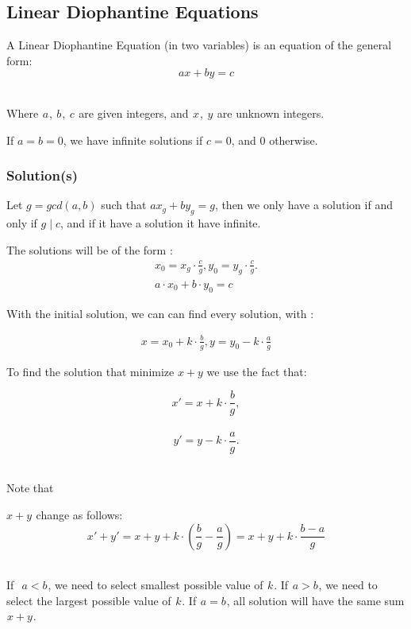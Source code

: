 \subsection{Linear Diophantine Equations}

A Linear Diophantine Equation (in two variables) is an equation of the general form:
 
$$ax + by = c$$ 

Where  $a$ ,  $b$ ,  $c$  are given integers, and  $x$ ,  $y$  are unknown integers.

If $ a = b = 0 $, we have infinite solutions if $ c = 0 $, and $0$ otherwise. 

\subsubsection{Solution(s)}

Let $g = gcd(a,b)$ such that $a x_g + b y_g = g$, then we only have a solution if and only if $g \mid c$, and if it have a solution it have infinite.

The solutions will be of the form :
 
\begin{equation}
  \begin{array}{c}
    x_0 = x_g \cdot \frac{c}{g},
 
    y_0 = y_g \cdot \frac{c}{g}. \\

    a \cdot x_0  + b \cdot y_0 = c 
  \end{array}
\end{equation}

With the initial solution, we can can find every solution, with : 

\begin{equation}
  \begin{array}{c}
    x = x_0 + k \cdot \frac{b}{g}, y = y_0 - k \cdot \frac{a}{g}
  \end{array}
\end{equation}

To find the solution that minimize $x + y$ we use the fact that: 

$$x' = x + k \cdot \frac{b}{g},$$ 
 
$$y' = y - k \cdot \frac{a}{g}.$$ 

Note that  

$x + y$  change as follows:
 
$$x' + y' = x + y + k \cdot \left(\frac{b}{g} - \frac{a}{g}\right) = x + y + k \cdot \frac{b-a}{g}$$ 

If  
$a < b$ , we need to select smallest possible value of  $k$ . If  $a > b$ , we need to select the largest possible value of  $k$ . If  $a = b$ , all solution will have the same sum  $x + y$ .
